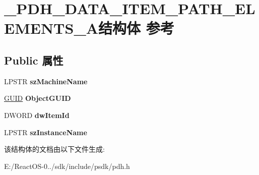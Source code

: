 \hypertarget{struct___p_d_h___d_a_t_a___i_t_e_m___p_a_t_h___e_l_e_m_e_n_t_s___a}{}\section{\+\_\+\+P\+D\+H\+\_\+\+D\+A\+T\+A\+\_\+\+I\+T\+E\+M\+\_\+\+P\+A\+T\+H\+\_\+\+E\+L\+E\+M\+E\+N\+T\+S\+\_\+\+A结构体 参考}
\label{struct___p_d_h___d_a_t_a___i_t_e_m___p_a_t_h___e_l_e_m_e_n_t_s___a}
\subsection*{Public 属性}
\begin{DoxyCompactItemize}
\item 
\mbox{\label{struct___p_d_h___d_a_t_a___i_t_e_m___p_a_t_h___e_l_e_m_e_n_t_s___a_ad9ab0a966bc48a8ec74e0bc7deef5591}} 
L\+P\+S\+TR {\bfseries sz\+Machine\+Name}
\item 
\mbox{\label{struct___p_d_h___d_a_t_a___i_t_e_m___p_a_t_h___e_l_e_m_e_n_t_s___a_a79324861cdd17cb457a4d4b34620b914}} 
\hyperlink{interface_g_u_i_d}{G\+U\+ID} {\bfseries Object\+G\+U\+ID}
\item 
\mbox{\label{struct___p_d_h___d_a_t_a___i_t_e_m___p_a_t_h___e_l_e_m_e_n_t_s___a_a4d62f4c20bd8aa9def6d041169222a22}} 
D\+W\+O\+RD {\bfseries dw\+Item\+Id}
\item 
\mbox{\label{struct___p_d_h___d_a_t_a___i_t_e_m___p_a_t_h___e_l_e_m_e_n_t_s___a_a9b9f98d351e1f52709c0aad0dd910584}} 
L\+P\+S\+TR {\bfseries sz\+Instance\+Name}
\end{DoxyCompactItemize}


该结构体的文档由以下文件生成\+:\begin{DoxyCompactItemize}
\item 
E\+:/\+React\+O\+S-\/0../sdk/include/psdk/pdh.\+h\end{DoxyCompactItemize}
